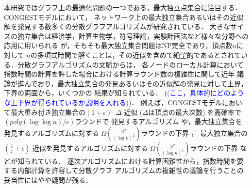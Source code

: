 \documentclass[12pt]{thesis}
\newcommand{\Izumi}[1]{\textcolor{blue}{(#1)}}
\newcommand{\CONGEST}{\textsf{CONGEST}}
\theoremstyle{definition}
\begin{document}
本研究ではグラフ上の最適化問題の一つである，最大独立点集合に注目する．{\CONGEST}モデルにおいて，
ネットワーク上の最大独立集合あるいはその近似解を発見する数多くの分散グラフアルゴリズムが研究されている．
大きなサイズの独立集合は経済学，計算生物学，符号理論，実験計画法など様々な分野への応用に用いられる
 \cite{kawarabayashi2019improved} が，そもそも最大独立集合問題はNP完全であり，頂点数$n$に対して
$n$の多項式時間で解くことは，その近似を含めて絶望的であるとされている．分散グラフアルゴリズムの文脈からは，
各ノードのローカル計算において指数時間の計算を許した場合における計算ラウンド数の複雑性に関して近年
議論が進んでおり，最大独立集合の発見あるいはその近似解の発見に対して上界，下界の両面から，いくつかの
結果が知られている．
(\Izumi{ここ，具体的にどのような上下界が得られているか説明を入れる})．
例えば，{\CONGEST}モデルにおいて最大重み付き独立集合の$(1 + \epsilon) \cdot \Delta$-近似
($\Delta$は頂点の最大次数) を高確率で$\left(poly(\log \log n)/\epsilon \right)$ラウンドで
発見するアルゴリズム\cite{kawarabayashi2019improved} や，最大独立集合を発見するアルゴリズムに対する
$\Omega \left(\frac{n^{2}}{(\log n)^{2}}\right)$ラウンドの下界 \cite{censor2017quadratic}，
最大独立集合の$(\frac{3}{4} + \epsilon)$-近似を発見するアルゴリズムに対する
$\Omega \left(\frac{n^{2}}{(\log n)^{3}}\right)$ラウンドの下界 \cite{efron2020beyond} などが知られている．
逐次アルゴリズムにおける計算困難性から，指数時間を要する内部計算を許容して分散グラフ
アルゴリズムの複雑性の議論を行うことの妥当性にはやや疑問が残る．
\end{document}
